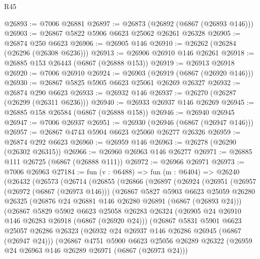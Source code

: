 \begin{lexlean}{R45}
\begin{coremodule}
{@26893 := @7006 @26881
@26897 := @26873 (@26892 (@6867 (@26893 @146)))
@26903 := @26867 @5822 @5906 @6623 @25062 @26261 @26328
@26905 := @26874 @250 @6623
@26906 := @26905 @146
@26910 := @26262 (@26284 (@26296 (@26308 @6236)))
@26913 := @26906 @26910 @146 @26261
@26918 := @26885 @153 @26443 (@6867 (@26888 @153))
@26919 := @26913 @26918
@26920 := @7006 @26910
@26924 := @26903 (@26919 (@6867 (@26920 @146)))
@26930 := @26867 @5825 @5905 @6623 @25061 @26269 @26327
@26932 := @26874 @290 @6623
@26933 := @26932 @146
@26937 := @26270 (@26287 (@26299 (@26311 @6236)))
@26940 := @26933 @26937 @146 @26269
@26945 := @26885 @158 @26584 (@6867 (@26888 @158))
@26946 := @26940 @26945
@26947 := @7006 @26937
@26951 := @26930 (@26946 (@6867 (@26947 @146)))
@26957 := @26867 @4743 @5904 @6623 @25060 @26277 @26326
@26959 := @26874 @292 @6623
@26960 := @26959 @146
@26963 := @26278 (@26290 (@26302 @26315))
@26966 := @26960 @26963 @146 @26277
@26971 := @26885 @111 @26725 (@6867 (@26888 @111))
@26972 := @26966 @26971
@26973 := @7006 @26963
@27184 := fun (v : @6488) =>
  fun (m : @6404) =>
  @26240
    (@26432
      (@26573
        (@26714
          (@26855
            (@26866
              (@26897
                (@26924
                  (@26951
                    (@26957
                      (@26972 (@6867 (@26973 @146)))
                      (@26867
                        @5827
                        @5903
                        @6623
                        @25059
                        @26280
                        @26325
                        (@26876 @24 @26881 @146 @26280 @26891 (@6867 (@26893 @24)))
                        (@26867
                          @5829
                          @5902
                          @6623
                          @25058
                          @26283
                          @26324
                          (@26905 @24 @26910 @146 @26283 @26918 (@6867 (@26920 @24)))
                          (@26867
                            @5831
                            @5901
                            @6623
                            @25057
                            @26286
                            @26323
                            (@26932 @24 @26937 @146 @26286 @26945 (@6867 (@26947 @24)))
                            (@26867
                              @4751
                              @5900
                              @6623
                              @25056
                              @26289
                              @26322
                              (@26959 @24 @26963 @146 @26289 @26971 (@6867 (@26973 @24)))
}
\end{coremodule}
\end{lexlean}
